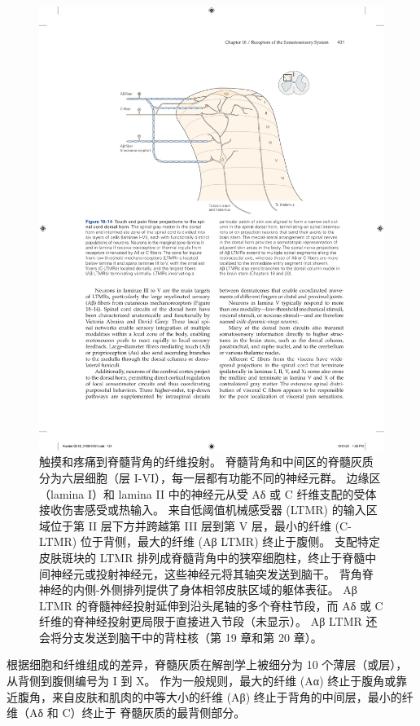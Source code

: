 \begin{figure}[htbp]
	\centering
	\includegraphics[width=1.0\linewidth]{chap18/fig_18_14}
	\caption{触摸和疼痛到脊髓背角的纤维投射。 脊髓背角和中间区的脊髓灰质分为六层细胞（层 I-VI），每一层都有功能不同的神经元群。 
		边缘区（lamina I）和 lamina II 中的神经元从受 Aδ 或 C 纤维支配的受体接收伤害感受或热输入。 
		来自低阈值机械感受器 (LTMR) 的输入区域位于第 II 层下方并跨越第 III 层到第 V 层，最小的纤维 (C-LTMR) 位于背侧，最大的纤维 (Aβ LTMR) 终止于腹侧。 
		支配特定皮肤斑块的 LTMR 排列成脊髓背角中的狭窄细胞柱，终止于脊髓中间神经元或投射神经元，这些神经元将其轴突发送到脑干。
		背角脊神经的内侧-外侧排列提供了身体相邻皮肤区域的躯体表征。 
		Aβ LTMR 的脊髓神经投射延伸到沿头尾轴的多个脊柱节段，而 Aδ 或 C 纤维的脊神经投射更局限于直接进入节段（未显示）。 
		Aβ LTMR 还会将分支发送到脑干中的背柱核（第 19 章和第 20 章）。}
	\label{fig:18_14}
\end{figure}

根据细胞和纤维组成的差异，脊髓灰质在解剖学上被细分为 10 个薄层（或层），从背侧到腹侧编号为 I 到 X。 
作为一般规则，最大的纤维 (Aα) 终止于腹角或靠近腹角，来自皮肤和肌肉的中等大小的纤维 (Aβ) 终止于背角的中间层，最小的纤维（Aδ 和 C）终止于 脊髓灰质的最背侧部分。


